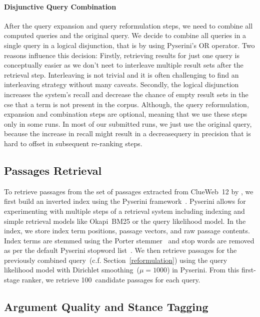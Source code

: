 \paragraph{Disjunctive Query Combination}
After the query expansion and query reformulation steps, we need to combine all computed queries and the original query.
We decide to combine all queries in a single query in a logical disjunction, that is by using Pyserini's OR operator.
Two reasons influence this decision:
Firstly, retrieving results for just one query is conceptually easier as we don't neet to interleave multiple result sets after the retrieval step.
Interleaving is not trivial and it is often challenging to find an interleaving strategy without many caveats.
Secondly, the logical disjunction increases the system's recall and decrease the chance of empty result sets in the cse that a term is not present in the corpus.
Although, the query reformulation, expansion and combination steps are optional, meaning that we use these steps only in some runs. In most of our submitted runs, we just use the original query, because the increase in recall might result in a decreasequery in precision that is hard to offset in subsequent re-ranking steps.

\subsection{Passages Retrieval}\label{retrieval}

To retrieve passages from the set of passages extracted from ClueWeb~12 by \citet{BondarenkoFKSGBPBSWPH2022}, we first build an inverted index using the Pyserini framework~\cite{LinMLYPN2021}.
Pyserini allows for experimenting with multiple steps of a retrieval system including indexing and simple retrieval models like Okapi~BM25 or the query likelihood model.
In the index, we store index term positions, passage vectors, and raw passage contents.
Index terms are stemmed using the Porter stemmer~\cite{Porter1980} and stop words are removed as per the default Pyserini stopword list~\cite{LinMLYPN2021}.
We then retrieve passages for the previously combined query~(c.f. Section~\ref{reformulation}) using the query likelihood model with Dirichlet smoothing~(\( \mu = 1000 \)) in Pyserini.
From this first-stage ranker, we retrieve 100~candidate passages for each query.

\subsection{Argument Quality and Stance Tagging}

